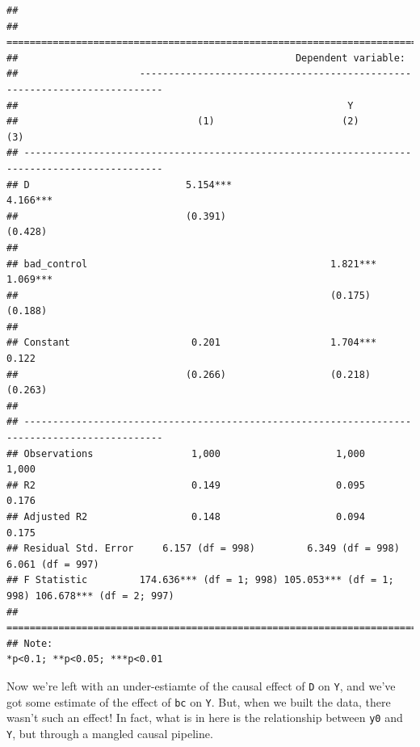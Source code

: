 \documentclass[
]{article}
\begin{document}
\begin{verbatim}
## 
## ==============================================================================================
##                                                Dependent variable:                            
##                     --------------------------------------------------------------------------
##                                                         Y                                     
##                               (1)                      (2)                      (3)           
## ----------------------------------------------------------------------------------------------
## D                           5.154***                                          4.166***        
##                             (0.391)                                           (0.428)         
##                                                                                               
## bad_control                                          1.821***                 1.069***        
##                                                      (0.175)                  (0.188)         
##                                                                                               
## Constant                     0.201                   1.704***                  0.122          
##                             (0.266)                  (0.218)                  (0.263)         
##                                                                                               
## ----------------------------------------------------------------------------------------------
## Observations                 1,000                    1,000                    1,000          
## R2                           0.149                    0.095                    0.176          
## Adjusted R2                  0.148                    0.094                    0.175          
## Residual Std. Error     6.157 (df = 998)         6.349 (df = 998)         6.061 (df = 997)    
## F Statistic         174.636*** (df = 1; 998) 105.053*** (df = 1; 998) 106.678*** (df = 2; 997)
## ==============================================================================================
## Note:                                                              *p<0.1; **p<0.05; ***p<0.01
\end{verbatim}

Now we're left with an under-estiamte of the causal effect of \texttt{D} on \texttt{Y}, and we've got some estimate of the effect of \texttt{bc} on \texttt{Y}. But, when we built the data, there wasn't such an effect! In fact, what is in here is the relationship between \texttt{y0} and \texttt{Y}, but through a mangled causal pipeline.
\end{document}
